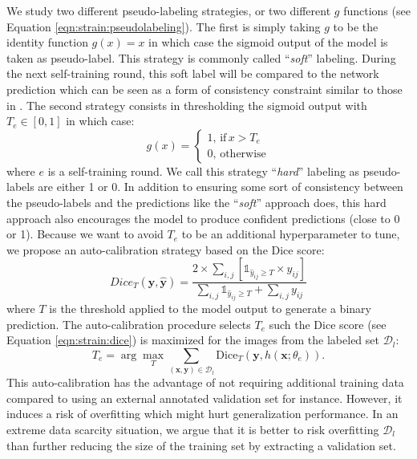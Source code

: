 We study two different pseudo-labeling strategies, or two different $g$ functions (see Equation \ref{eqn:strain:pseudolabeling}). The first is simply taking $g$ to be the identity function $g(x) = x$ in which case the sigmoid output of the model is taken as pseudo-label. This strategy is commonly called  ``\textit{soft}'' labeling. During the next self-training round, this soft label will be compared to the network prediction which can be seen as a form of consistency constraint similar to those in \cite{laine2016temporal,tarvainen2017mean, sohn2020fixmatch}. The second strategy consists in thresholding the sigmoid output with $T_e \in [0, 1]$ in which case:
\begin{equation}
g(x) = \begin{cases}
1,\,\text{if}\, x > T_e\\
0,\,\text{otherwise}
\end{cases}
\end{equation}   
where $e$ is a self-training round. We call this strategy ``\textit{hard}'' labeling as pseudo-labels are either 1 or 0. In addition to ensuring some sort of consistency between the pseudo-labels and the predictions like the ``\textit{soft}'' approach does, this hard approach also encourages the model to produce confident predictions (close to 0 or 1). Because we want to avoid $T_e$ to be an additional hyperparameter to tune, we propose an auto-calibration strategy based on the Dice score: 
\begin{equation}
  Dice_T(\mathbf{y},\hat{\mathbf{y}}) = \dfrac{2 \times \sum_{i,j} \left[\mathbb{1}_{\hat{y}_{ij} \geq T} \times y_{ij}\right]}{\sum_{i,j} \mathbb{1}_{\hat{y}_{ij} \geq T} + \sum_{i,j} y_{ij}}
  \label{eqn:strain:dice}
\end{equation}
where $T$ is the threshold applied to the model output to generate a binary prediction. The auto-calibration procedure selects $T_e$ such the Dice score (see Equation \ref{eqn:strain:dice}) is maximized for the images from the labeled set $\mathcal{D}_{l}$:
\begin{equation}
T_e = \arg \underset{T}{\max} \sum_{(\mathbf{x}, \mathbf{y}) \in \mathcal{D}_l} \text{Dice}_T\left(\mathbf{y},h( \mathbf{x}; \theta_{e})\right).
\label{eqn:strain:thresholdopt}
\end{equation}
This auto-calibration has the advantage of not requiring additional training data compared to using an external annotated validation set for instance. However, it induces a risk of overfitting which might hurt generalization performance. In an extreme data scarcity situation, we argue that it is better to risk overfitting $\mathcal{D}_l$ than further reducing the size of the training set by extracting a validation set.

